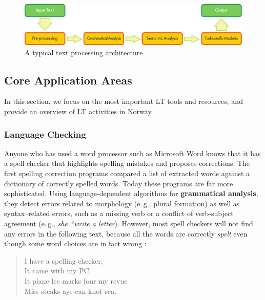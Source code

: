 \begin{multicols}{2}
\begin{figure}[htb]
  \center
  \includegraphics[width=\textwidth]{../_media/english/text_processing_app_architecture}
  \caption{A typical text processing architecture}
\label{fig:textprocessingarch_en}
\end{figure}

\subsection{Core Application Areas}

In this section, we focus on the most important LT tools and resources, and provide an overview of LT activities in 
Norway. 

\subsubsection{Language Checking}

Anyone who has used a word processor such as Microsoft Word knows that it has a spell checker that highlights spelling mistakes and proposes corrections. The first spelling correction programs compared a list of extracted words against a dictionary of correctly spelled words. Today these programs are far more sophisticated. Using language-dependent algorithms for \textbf{grammatical analysis}, they detect errors related to morphology (e.\,g., plural formation) as well as syntax–related errors, such as a missing verb or a conflict of verb-subject agreement (e.\,g., \textit{she *write a letter}). However, most spell checkers will not find any errors in the following text, because all the words are correctly \textit{spelt} even though some word choices are in fact wrong \cite{zar1}:

\begin{quote}
  I have a spelling checker,\\
  It came with my PC.\\
  It plane lee marks four my revue\\
  Miss steaks aye can knot sea.
\end{quote}


\end{multicols}
